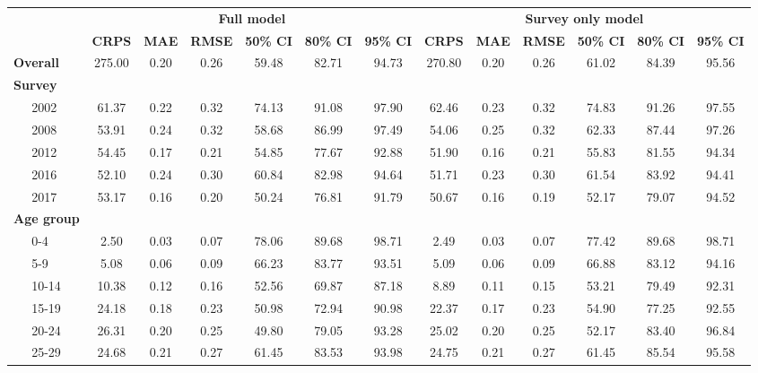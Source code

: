 \documentclass{article}
\begin{document}
\begin{appendix}
\begin{landscape}
{
\begin{table}[H]
\linespread{1}
\footnotesize
    \centering
    \begin{tabular}{ll ccc ccc ccc ccc}
      \hline
       & & \multicolumn{6}{c}{\textbf{Full model}} & \multicolumn{6}{c}{\textbf{Survey only  model}}\\
      \cmidrule(lr){3-8}
      \cmidrule(lr){9-14}
       & & {\bf CRPS} & {\bf MAE} & {\bf RMSE} & {\bf 50\% CI} & {\bf 80\% CI} & {\bf 95\% CI} & {\bf CRPS} & {\bf MAE} & {\bf RMSE} & {\bf 50\% CI} & {\bf 80\% CI} & {\bf 95\% CI} \\[1pt]
      \hline
    \multicolumn{2}{l}{\textbf{Overall}}  & 275.00 & 0.20 & 0.26 & 59.48 & 82.71 & 94.73 & 270.80 & 0.20 & 0.26 & 61.02 & 84.39 &  95.56 \\ [5pt] 
    \multicolumn{2}{l}{\textbf{Survey}} \\
    & 2002 &  61.37 & 0.22 & 0.32 & 74.13 & 91.08 & 97.90 &  62.46 & 0.23 & 0.32 & 74.83 & 91.26 &  97.55 \\ 
    & 2008 &  53.91 & 0.24 & 0.32 & 58.68 & 86.99 & 97.49 &  54.06 & 0.25 & 0.32 & 62.33 & 87.44 &  97.26 \\ 
    & 2012 &  54.45 & 0.17 & 0.21 & 54.85 & 77.67 & 92.88 &  51.90 & 0.16 & 0.21 & 55.83 & 81.55 &  94.34 \\ 
    & 2016 &  52.10 & 0.24 & 0.30 & 60.84 & 82.98 & 94.64 &  51.71 & 0.23 & 0.30 & 61.54 & 83.92 &  94.41 \\ 
    & 2017 &  53.17 & 0.16 & 0.20 & 50.24 & 76.81 & 91.79 &  50.67 & 0.16 & 0.19 & 52.17 & 79.07 &  94.52 \\[5pt]
    \multicolumn{2}{l}{\textbf{Age group}} \\
    & 0-4 &   2.50 & 0.03 & 0.07 & 78.06 & 89.68 & 98.71 &   2.49 & 0.03 & 0.07 & 77.42 & 89.68 &  98.71 \\ 
    & 5-9 &   5.08 & 0.06 & 0.09 & 66.23 & 83.77 & 93.51 &   5.09 & 0.06 & 0.09 & 66.88 & 83.12 &  94.16 \\ 
    & 10-14 &  10.38 & 0.12 & 0.16 & 52.56 & 69.87 & 87.18 &   8.89 & 0.11 & 0.15 & 53.21 & 79.49 &  92.31 \\ 
    & 15-19 &  24.18 & 0.18 & 0.23 & 50.98 & 72.94 & 90.98 &  22.37 & 0.17 & 0.23 & 54.90 & 77.25 &  92.55 \\ 
    & 20-24 &  26.31 & 0.20 & 0.25 & 49.80 & 79.05 & 93.28 &  25.02 & 0.20 & 0.25 & 52.17 & 83.40 &  96.84 \\ 
    & 25-29 &  24.68 & 0.21 & 0.27 & 61.45 & 83.53 & 93.98 &  24.75 & 0.21 & 0.27 & 61.45 & 85.54 &  95.58 \\ 

\end{tabular}
\end{table}}
\end{landscape}
\end{appendix}
\end{document}
